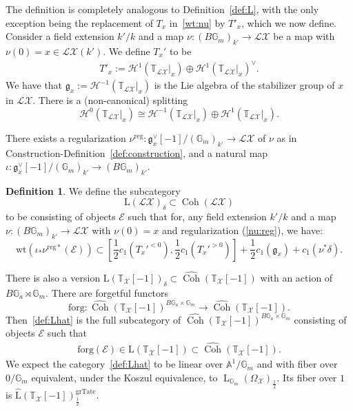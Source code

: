 \documentclass [11pt,oneside,a4paper,mathscr]{amsart}
\theoremstyle{definition}
\newtheorem{defn}[thm]{Definition}
\newcommand{\LL}{\operatorname{L}}
\newcommand{\X}{\mathcal{X}}
\newcommand{\bgm}{B\mathbb{G}_m}
\newcommand{\Coh}{\operatorname{Coh}}
\newcommand{\wt}{\mathrm{wt}}
\begin{document}
The definition is completely analogous to Definition~\ref{def:L}, with the only exception being the replacement of $T_x$ in~\eqref{wt:nu} by $T'_x$, which we now define. Consider a field extension $k'/k$ and a map $\nu\colon (\bgm)_{k'}\to\mathcal{L}\X$ be a map with $\nu(0)=x\in \mathcal{L}\X(k')$. 
We define $T_x'$ to be \begin{align*}T'_x:=\mathcal{H}^{1}(\mathbb{T}_{\mathcal{L}\X}|_x)\oplus \mathcal{H}^{1}(\mathbb{T}_{\mathcal{L}\X}|_x)^\vee.\end{align*}
We have that $\mathfrak{g}_x:=\mathcal{H}^{-1}(\mathbb{T}_{\mathcal{L}\X}|_x)$ is the Lie algebra of the stabilizer group of $x$ in $\mathcal{L}\X$. There is a (non-canonical) splitting 
\[\mathcal{H}^0(\mathbb{T}_{\mathcal{L}\X}|_x)\cong \mathcal{H}^{-1}(\mathbb{T}_{\mathcal{L}\X}|_x)\oplus \mathcal{H}^{1}(\mathbb{T}_{\mathcal{L}\X}|_x).\]

There exists a regularization $\nu^{\text{reg}}\colon \mathfrak{g}_x^\vee[-1]/(\mathbb{G}_m)_{k'}\to \mathcal{L}\X$ of $\nu$ as in Construction-Definition~\ref{def:construction}, and a natural map $\iota\colon \mathfrak{g}_x^{\vee}[-1]/(\mathbb{G}_m)_{k'} \to 
    (\bgm)_{k'}$. 

\begin{defn}
    

    
We define the subcategory \[\text{L}(\mathcal{L}\X)_\delta\subset \Coh(\mathcal{L}\X)\] to be consisting of objects $\mathcal{E}$ 
such that for, any field extension $k'/k$ and a map
$\nu \colon (\bgm)_{k'} \to \mathcal{L}\X$ 
with $\nu(0)=x$ and regularization (\ref{nu:reg}),
we have:
\[\wt(\iota_{\ast}\nu^{\mathrm{reg}\ast}(\mathcal{E}))
\subset \left[\frac{1}{2} c_1 (T_x'^{<0}),
\frac{1}{2} c_1 (T_x'^{>0}) \right]+
\frac{1}{2}c_1(\mathfrak{g}_x)+c_1(\nu^*\delta).\]

\end{defn}


There is also a version $\text{L}(\mathbb{T}_\X[-1])_\delta\subset \hat{\Coh}(\mathbb{T}_\X[-1])$ with an action of $B\mathbb{G}_a\rtimes \mathbb{G}_m$. There are forgetful functors \[\text{forg}\colon \hat{\Coh}(\mathbb{T}_\X[-1])^{B\mathbb{G}_a\times\mathbb{G}_m}\to \hat{\Coh}(\mathbb{T}_\X[-1]).\]
Then~\eqref{def:Lhat} is the full subcategory of $\hat{\Coh}(\mathbb{T}_\X[-1])^{B\mathbb{G}_a\times\mathbb{G}_m}$ consisting of objects $\mathcal{E}$ such that \begin{align*}\text{forg}(\mathcal{E})\in \text{L}(\mathbb{T}_\X[-1])\subset \hat{\Coh}(\mathbb{T}_\X[-1]).
\end{align*}
We expect the category~\eqref{def:Lhat} to be linear over $\mathbb{A}^1/\mathbb{G}_m$ and 
with fiber over $0/\mathbb{G}_m$
equivalent, under the Koszul equivalence, to $\LL_{\mathbb{G}_m}(\Omega_\X)_{\frac{1}{2}}$. 
Its fiber over $1$ is $\hat{\text{L}}(\mathbb{T}_\X[-1])^{\text{grTate}}_{\frac{1}{2}}$. 
\end{document}
